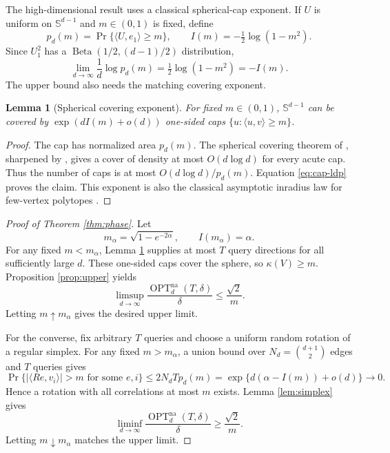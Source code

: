 \documentclass{article}
\newcommand{\Sph}{\mathbb{S}}
\newcommand{\ip}[2]{\langle #1,#2\rangle}
\newcommand{\OPT}{\operatorname{OPT}}
\newcommand{\na}{\mathrm{na}}
\newtheorem{lemma}[theorem]{Lemma}
\theoremstyle{definition}
\begin{document}
The high-dimensional result uses a classical spherical-cap exponent.  If $U$ is uniform on $\Sph^{d-1}$ and $m\in(0,1)$ is fixed, define \[ p_d(m)=\Pr\{\ip{U}{e_1}\geq m\},\qquad I(m)=-\tfrac12\log(1-m^2). \] Since $U_1^2$ has a $\operatorname{Beta}(1/2,(d-1)/2)$ distribution,
\begin{equation}
 \lim_{d\to\infty}\frac1d\log p_d(m)
 =\tfrac12\log(1-m^2)=-I(m).                    \label{eq:cap-ldp}
\end{equation}
The upper bound also needs the matching covering exponent.

\begin{lemma}[Spherical covering exponent]                          \label{lem:cover-exp}
For fixed $m\in(0,1)$, $\Sph^{d-1}$ can be covered by $\exp(dI(m)+o(d))$ one-sided caps $\{u:\ip{u}{v}\geq m\}$.
\end{lemma}

\begin{proof}
The cap has normalized area $p_d(m)$.  The spherical covering theorem of \citet{boroczky2003covering}, sharpened by \citet{dumer2007covering}, gives a cover of density at most $O(d\log d)$ for every acute cap.  Thus the number of caps is at most $O(d\log d)/p_d(m)$.  Equation \eqref{eq:cap-ldp} proves the claim.  This exponent is also the classical asymptotic inradius law for few-vertex polytopes \citep{barany1988approximation}.
\end{proof}

\begin{proof}[Proof of Theorem \ref{thm:phase}]
Let \[ m_\alpha=\sqrt{1-e^{-2\alpha}}, \qquad I(m_\alpha)=\alpha. \] For any fixed $m<m_\alpha$, Lemma \ref{lem:cover-exp} supplies at most $T$ query directions for all sufficiently large $d$.  These one-sided caps cover the sphere, so $\kappa(V)\geq m$.  Proposition \ref{prop:upper} yields \[ \limsup_{d\to\infty}\frac{\OPT^{\na}_d(T,\delta)}{\delta} \leq\frac{\sqrt2}{m}. \] Letting $m\uparrow m_\alpha$ gives the desired upper limit.

For the converse, fix arbitrary $T$ queries and choose a uniform random rotation of a regular simplex.  For any fixed $m>m_\alpha$, a union bound over $N_d=\binom{d+1}{2}$ edges and $T$ queries gives \[ \Pr\big\{|\ip{Re}{v_i}|>m\text{ for some }e,i\big\} \leq 2N_dT p_d(m) =\exp\{d(\alpha-I(m))+o(d)\}\longrightarrow0. \] Hence a rotation with all correlations at most $m$ exists.  Lemma \ref{lem:simplex} gives \[ \liminf_{d\to\infty}\frac{\OPT^{\na}_d(T,\delta)}{\delta} \geq\frac{\sqrt2}{m}. \] Letting $m\downarrow m_\alpha$ matches the upper limit.
\end{proof}
\end{document}
